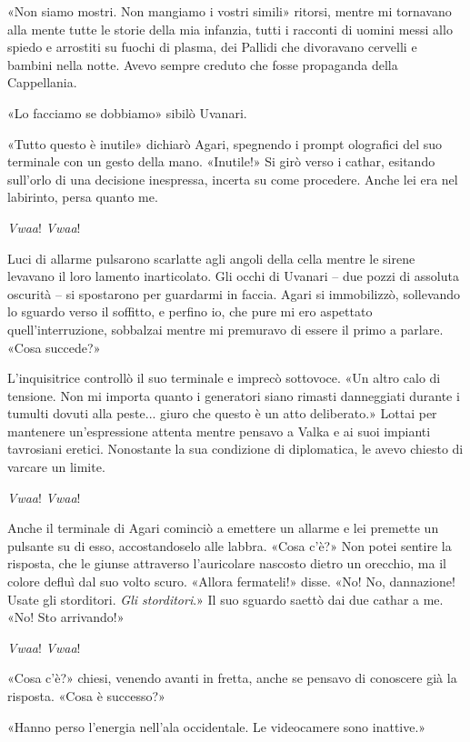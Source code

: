 «Non siamo mostri. Non mangiamo i vostri simili» ritorsi, mentre mi
tornavano alla mente tutte le storie della mia infanzia, tutti i
racconti di uomini messi allo spiedo e arrostiti su fuochi di plasma,
dei Pallidi che divoravano cervelli e bambini nella notte. Avevo sempre
creduto che fosse propaganda della Cappellania.

«Lo facciamo se dobbiamo» sibilò Uvanari.

«Tutto questo è inutile» dichiarò Agari, spegnendo i prompt olografici
del suo terminale con un gesto della mano. «Inutile!» Si girò verso i
cathar, esitando sull'orlo di una decisione inespressa, incerta su come
procedere. Anche lei era nel labirinto, persa quanto me.

\emph{Vwaa}! \emph{Vwaa}!

Luci di allarme pulsarono scarlatte agli angoli della cella mentre le
sirene levavano il loro lamento inarticolato. Gli occhi di Uvanari --
due pozzi di assoluta oscurità -- si spostarono per guardarmi in faccia.
Agari si immobilizzò, sollevando lo sguardo verso il soffitto, e perfino
io, che pure mi ero aspettato quell'interruzione, sobbalzai mentre mi
premuravo di essere il primo a parlare. «Cosa succede?»

L'inquisitrice controllò il suo terminale e imprecò sottovoce. «Un altro
calo di tensione. Non mi importa quanto i generatori siano rimasti
danneggiati durante i tumulti dovuti alla peste... giuro che questo è un
atto deliberato.» Lottai per mantenere un'espressione attenta mentre
pensavo a Valka e ai suoi impianti tavrosiani eretici. Nonostante la sua
condizione di diplomatica, le avevo chiesto di varcare un limite.

\emph{Vwaa}! \emph{Vwaa}!

Anche il terminale di Agari cominciò a emettere un allarme e lei
premette un pulsante su di esso, accostandoselo alle labbra. «Cosa c'è?»
Non potei sentire la risposta, che le giunse attraverso l'auricolare
nascosto dietro un orecchio, ma il colore defluì dal suo volto scuro.
«Allora fermateli!» disse. «No! No, dannazione! Usate gli storditori.
\emph{Gli storditori}.» Il suo sguardo saettò dai due cathar a me. «No!
Sto arrivando!»

\emph{Vwaa}! \emph{Vwaa}!

«Cosa c'è?» chiesi, venendo avanti in fretta, anche se pensavo di
conoscere già la risposta. «Cosa è successo?»

«Hanno perso l'energia nell'ala occidentale. Le videocamere sono
inattive.»

